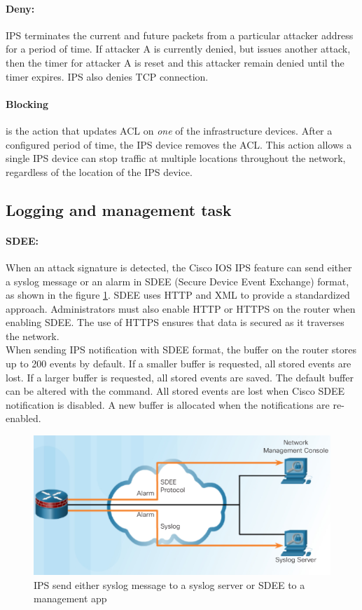 \paragraph{Deny:} IPS terminates the current and future packets from a particular attacker address for a period of time. If attacker A is currently denied, but issues another attack, then the timer for attacker A is reset and this attacker remain denied until the timer expires. IPS also denies TCP connection.


\paragraph{Blocking} is the action that updates ACL on \emph{one} of the infrastructure devices. After a configured period of time, the IPS device removes the ACL. This action allows a single IPS device can stop traffic at multiple locations throughout the network, regardless of the location of the IPS device. 


\subsection{Logging and management task} 

\paragraph{SDEE:} When an attack signature is detected, the Cisco IOS IPS feature can send either a syslog message or an alarm in SDEE (Secure Device Event Exchange) format, as shown in the figure \ref{SDEE}. SDEE uses HTTP and XML to provide a standardized approach. Administrators must also enable HTTP or HTTPS on the router when enabling SDEE. The use of HTTPS ensures that data is secured as it traverses the network.\\

When sending IPS notification with SDEE format, the buffer on the router stores up to 200 events by default. If a smaller buffer is requested, all stored events are lost. If a larger buffer is requested, all stored events are saved. The default buffer can be altered with the  command. All stored events are lost when Cisco SDEE notification is disabled. A new buffer is allocated when the notifications are re-enabled.\\


\begin{figure}[hbtp]
\caption{IPS send either syslog message to a syslog server or SDEE to a management app}\label{SDEE}
\centering
\includegraphics[scale=0.7]{pictures/SDEE.PNG}
\end{figure}

